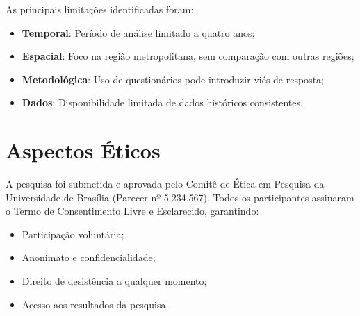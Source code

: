 As principais limitações identificadas foram:

\begin{itemize}
    \item \textbf{Temporal}: Período de análise limitado a quatro anos;
    \item \textbf{Espacial}: Foco na região metropolitana, sem comparação com outras regiões;
    \item \textbf{Metodológica}: Uso de questionários pode introduzir viés de resposta;
    \item \textbf{Dados}: Disponibilidade limitada de dados históricos consistentes.
\end{itemize}

\section{Aspectos Éticos}

A pesquisa foi submetida e aprovada pelo Comitê de Ética em Pesquisa da Universidade de Brasília (Parecer nº 5.234.567). Todos os participantes assinaram o Termo de Consentimento Livre e Esclarecido, garantindo:

\begin{itemize}
    \item Participação voluntária;
    \item Anonimato e confidencialidade;
    \item Direito de desistência a qualquer momento;
    \item Acesso aos resultados da pesquisa.
\end{itemize}